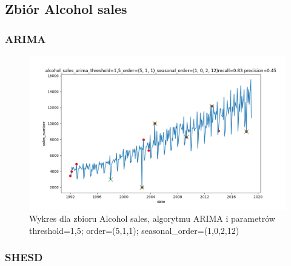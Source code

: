 \documentclass{classrep}
\begin{document}
{        \subsection{Zbiór Alcohol sales} {

            \subsubsection{ARIMA} {

                \begin{figure}[!htbp]
                    \centering
                    \includegraphics[width=\textwidth]{img/alcohol_sales_arima_threshold=1,5_order=(5,1,1)_seasonal_order=(1,0,2,12)-203803.png}
                    \caption
                    {Wykres dla zbioru Alcohol sales, algorytmu ARIMA i parametrów threshold=1,5; order=(5,1,1); seasonal\_order=(1,0,2,12)}
                    \label{fig:arima_alcohol}
                \end{figure}
                \FloatBarrier
            }

            \subsubsection{SHESD} {

}}}
\end{document}
